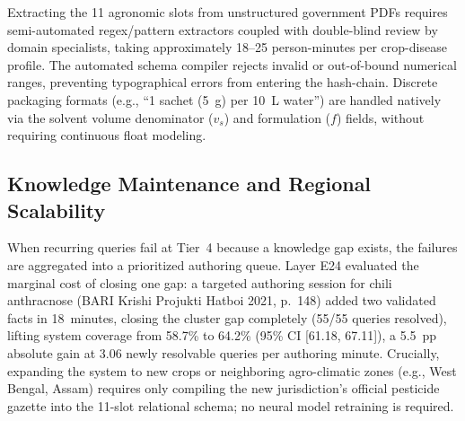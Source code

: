 Extracting the 11 agronomic slots from unstructured government PDFs requires semi-automated regex/pattern extractors coupled with double-blind review by domain specialists, taking approximately 18--25 person-minutes per crop-disease profile. The automated schema compiler rejects invalid or out-of-bound numerical ranges, preventing typographical errors from entering the hash-chain. Discrete packaging formats (e.g., ``1 sachet (5~g) per 10~L water'') are handled natively via the solvent volume denominator ($v_s$) and formulation ($f$) fields, without requiring continuous float modeling.

\subsection{Knowledge Maintenance and Regional Scalability}
When recurring queries fail at Tier~4 because a knowledge gap exists, the failures are aggregated into a prioritized authoring queue. Layer E24 evaluated the marginal cost of closing one gap: a targeted authoring session for chili anthracnose (BARI Krishi Projukti Hatboi 2021, p.~148) added two validated facts in 18~minutes, closing the cluster gap completely (55/55 queries resolved), lifting system coverage from 58.7\% to 64.2\% (95\% CI [61.18, 67.11]), a 5.5~pp absolute gain at 3.06 newly resolvable queries per authoring minute. Crucially, expanding the system to new crops or neighboring agro-climatic zones (e.g., West Bengal, Assam) requires only compiling the new jurisdiction's official pesticide gazette into the 11-slot relational schema; no neural model retraining is required.


